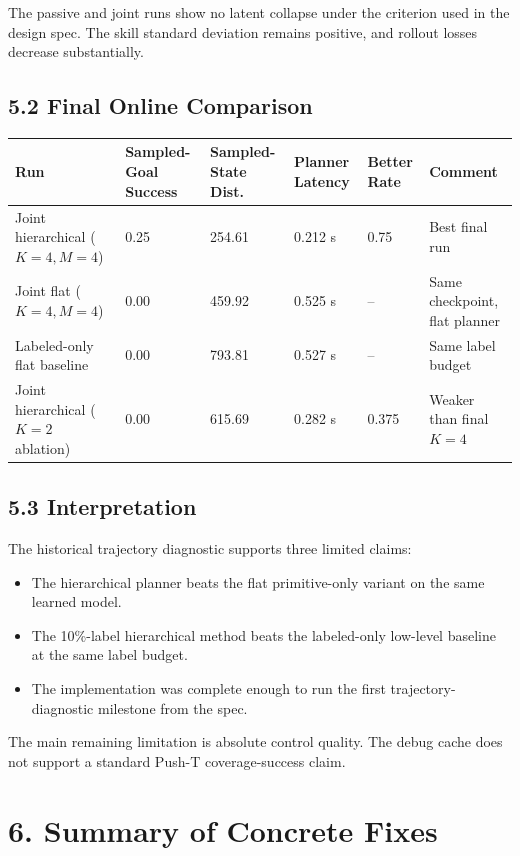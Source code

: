 \documentclass[11pt]{article}
\begin{document}
The passive and joint runs show no latent collapse under the criterion used in the design spec.
The skill standard deviation remains positive, and rollout losses decrease substantially.

\subsection*{5.2 Final Online Comparison}

\begin{center}
\small
\begin{tabular}{llllll}
\toprule
\rowcolor{ReportBlue!10}
Run & Sampled-Goal Success & Sampled-State Dist. & Planner Latency & Better Rate & Comment \\
\midrule
Joint hierarchical (\(K=4, M=4\)) & 0.25 & 254.61 & 0.212 s & 0.75 & Best final run \\
Joint flat (\(K=4, M=4\)) & 0.00 & 459.92 & 0.525 s & -- & Same checkpoint, flat planner \\
Labeled-only flat baseline & 0.00 & 793.81 & 0.527 s & -- & Same label budget \\
Joint hierarchical (\(K=2\) ablation) & 0.00 & 615.69 & 0.282 s & 0.375 & Weaker than final \(K=4\) \\
\bottomrule
\end{tabular}
\end{center}

\subsection*{5.3 Interpretation}

The historical trajectory diagnostic supports three limited claims:

\begin{itemize}
\item The hierarchical planner beats the flat primitive-only variant on the same learned model.
\item The 10\%-label hierarchical method beats the labeled-only low-level baseline at the same label budget.
\item The implementation was complete enough to run the first trajectory-diagnostic milestone from the spec.
\end{itemize}

The main remaining limitation is absolute control quality.
The debug cache does not support a standard Push-T coverage-success claim.

\section*{6. Summary of Concrete Fixes}
\end{document}
